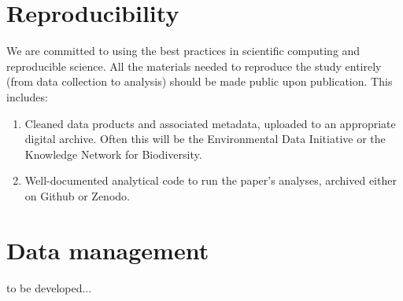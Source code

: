 \documentclass[12pt]{article}
\begin{document}
\section{Reproducibility}
We are committed to using the best practices in scientific computing and reproducible science. All the materials needed to reproduce the study entirely (from data collection to analysis) should be made public upon publication. This includes:
\begin{enumerate}
\item Cleaned data products and associated metadata, uploaded to an appropriate digital archive. Often this will be the Environmental Data Initiative or the Knowledge Network for Biodiversity.
\item Well-documented analytical code to run the  paper's analyses, archived either on Github or Zenodo.
\end{enumerate}

\section{Data management}
to be developed...
\end{document}
